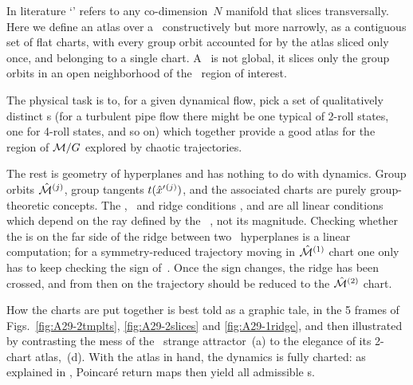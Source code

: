 \documentclass[aip,cha,reprint,
secnumarabic,
nofootinbib, tightenlines,
nobibnotes, showkeys, showpacs,
groupedaddress
]{revtex4-1}
\begin{document}


In literature `\slice' refers to any
co-dimension~$N$ manifold that slices transversally. Here we define
an atlas over a \slice\ constructively but more narrowly, as a contiguous
set of flat charts, with every group orbit accounted for by the
atlas sliced only once, and belonging to a single chart. A \slice\ is not
global, it slices only the group orbits in an open neighborhood of the
\statesp\ region of interest.

The physical task is to, for a given dynamical flow, pick a set of
qualitatively distinct {\template s} (for a turbulent pipe
flow there might be one typical of 2-roll states, one for 4-roll states, and so on)
which together provide a good atlas for the region of ${\cal M}/G$
explored by chaotic trajectories.

The rest is geometry of hyperplanes and has nothing to do with dynamics.
Group orbits $\hat{\cal M}{}^{(j)}$, group tangents
$t({\hat{x}'}{}^{(j)})$, and the associated charts are purely
group-theoretic concepts. The \slice, \chartBord\ and ridge conditions
,  and  are all linear
conditions which depend on the ray defined by the \template\ \slicep, not
its magnitude. Checking whether the {\chartBord} is on the far side of
the ridge between two \slice\ hyperplanes is a linear computation; for a
symmetry-reduced trajectory moving in $\hat{\cal M}{}^{(1)}$ chart one only has
to keep checking the sign of
\beq
{}
\,.
Once the sign changes, the ridge has been crossed, and from then on
the trajectory should be reduced to the $\hat{\cal M}{}^{(2)}$ chart.

How the charts are put together is best told as a graphic tale, in the 5
frames of Figs.~\ref{fig:A29-2tmplts}, \ref{fig:A29-2slices} and
\ref{fig:A29-1ridge}, and then illustrated by contrasting the mess of the
\cLe\ strange attractor \,(a) to the elegance of
its 2-chart atlas, \,(d). With the atlas in hand,
the dynamics is fully charted: as explained in ,
Poincar\'e return maps then yield all admissible \rpo s.
\end{document}
